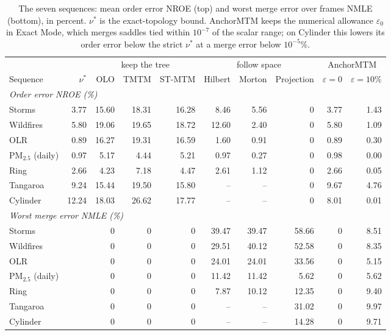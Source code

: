\documentclass[preprint]{vgtc}   %
\begin{document}
\begin{table}[t]
\centering\small
\caption{The seven sequences: mean order error NROE (top) and worst merge error over frames NMLE (bottom), in percent. $\nu^*$ is the exact-topology bound. AnchorMTM keeps the numerical allowance $\varepsilon_0$ in Exact Mode, which merges saddles tied within $10^{-7}$ of the scalar range; on Cylinder this lowers its order error below the strict $\nu^*$ at a merge error below $10^{-5}$\%.}\label{tab:full-order}
\setlength{\tabcolsep}{4pt}
\begin{tabular}{lr|rrr|rrr|rr}\toprule
 & & \multicolumn{3}{c|}{keep the tree} & \multicolumn{3}{c|}{follow space} & \multicolumn{2}{c}{AnchorMTM}\\
Sequence & $\nu^*$ & OLO & TMTM & ST-MTM & Hilbert & Morton & Projection & $\varepsilon=0$ & $\varepsilon=10\%$\\\midrule
\multicolumn{10}{l}{\emph{Order error NROE (\%)}}\\
Storms & 3.77 & 15.60 & 18.31 & 16.28 & 8.46 & 5.56 & 0 & 3.77 & 1.43\\
Wildfires & 5.80 & 19.06 & 19.65 & 18.72 & 12.60 & 2.40 & 0 & 5.80 & 1.09\\
OLR & 0.89 & 16.27 & 19.31 & 16.59 & 1.60 & 0.91 & 0 & 0.89 & 0.30\\
PM$_{2.5}$ (daily) & 0.97 & 5.17 & 4.44 & 5.21 & 0.97 & 0.27 & 0 & 0.98 & 0.00\\
Ring & 2.66 & 4.23 & 7.18 & 4.47 & 2.61 & 1.12 & 0 & 2.66 & 0.05\\
Tangaroa & 9.24 & 15.44 & 19.50 & 15.80 & -- & -- & 0 & 9.67 & 4.76\\
Cylinder & 12.24 & 18.03 & 26.62 & 17.77 & -- & -- & 0 & 8.01 & 0.01\\\midrule
\multicolumn{10}{l}{\emph{Worst merge error NMLE (\%)}}\\
Storms & & 0 & 0 & 0 & 39.47 & 39.47 & 58.66 & 0 & 8.51\\
Wildfires & & 0 & 0 & 0 & 29.51 & 40.12 & 52.58 & 0 & 8.35\\
OLR & & 0 & 0 & 0 & 24.01 & 24.01 & 33.56 & 0 & 5.15\\
PM$_{2.5}$ (daily) & & 0 & 0 & 0 & 11.42 & 11.42 & 5.62 & 0 & 5.62\\
Ring & & 0 & 0 & 0 & 7.87 & 10.12 & 12.35 & 0 & 9.40\\
Tangaroa & & 0 & 0 & 0 & -- & -- & 31.02 & 0 & 9.97\\
Cylinder & & 0 & 0 & 0 & -- & -- & 14.28 & 0 & 9.71\\\bottomrule
\end{tabular}
\end{table}
\end{document}
